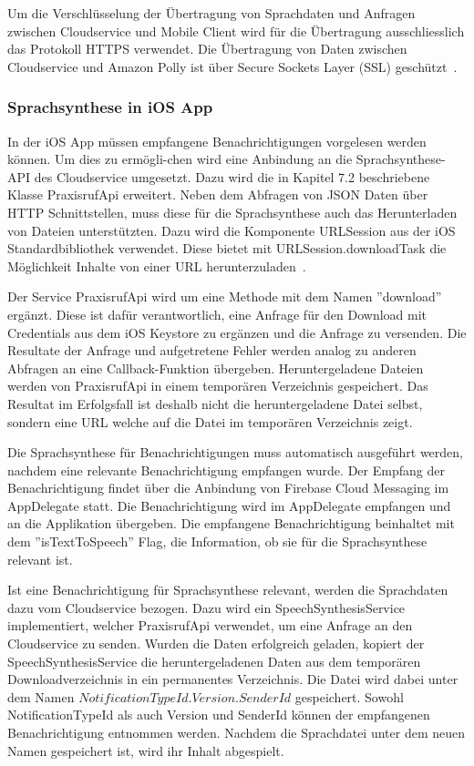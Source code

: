 Um die Verschlüsselung der Übertragung von Sprachdaten und Anfragen zwischen Cloudservice und Mobile Client wird für die Übertragung ausschliesslich das Protokoll HTTPS verwendet.
Die Übertragung von Daten zwischen Cloudservice und Amazon Polly ist über Secure Sockets Layer (SSL) geschützt~\cite{aws_polly_encryption_in_transit}.

\subsubsection{Sprachsynthese in iOS App}

In der iOS App müssen empfangene Benachrichtigungen vorgelesen werden können.
Um dies zu ermögli-chen wird eine Anbindung an die Sprachsynthese-API des Cloudservice umgesetzt.
Dazu wird die in Kapitel 7.2 beschriebene Klasse PraxisrufApi erweitert.
Neben dem Abfragen von JSON Daten über HTTP Schnittstellen, muss diese für die Sprachsynthese auch das Herunterladen von Dateien unterstützten.
Dazu wird die Komponente URLSession aus der iOS Standardbibliothek verwendet.
Diese bietet mit URLSession.downloadTask die Möglichkeit Inhalte von einer URL herunterzuladen~\cite{ios_downloadtask}.

Der Service PraxisrufApi wird um eine Methode mit dem Namen ''download'' ergänzt.
Diese ist dafür verantwortlich, eine Anfrage für den Download mit Credentials aus dem iOS Keystore zu ergänzen und die Anfrage zu versenden.
Die Resultate der Anfrage und aufgetretene Fehler werden analog zu anderen Abfragen an eine Callback-Funktion übergeben.
Heruntergeladene Dateien werden von PraxisrufApi in einem temporären Verzeichnis gespeichert.
Das Resultat im Erfolgsfall ist deshalb nicht die heruntergeladene Datei selbst, sondern eine URL welche auf die Datei im temporären Verzeichnis zeigt.

Die Sprachsynthese für Benachrichtigungen muss automatisch ausgeführt werden, nachdem eine relevante Benachrichtigung empfangen wurde.
Der Empfang der Benachrichtigung findet über die Anbindung von Firebase Cloud Messaging im AppDelegate statt.
Die Benachrichtigung wird im AppDelegate empfangen und an die Applikation übergeben.
Die empfangene Benachrichtigung beinhaltet mit dem ''isTextToSpeech'' Flag, die Information, ob sie für die Sprachsynthese relevant ist.

Ist eine Benachrichtigung für Sprachsynthese relevant, werden die Sprachdaten dazu vom Cloudservice bezogen.
Dazu wird ein SpeechSynthesisService implementiert, welcher PraxisrufApi verwendet, um eine Anfrage an den Cloudservice zu senden.
Wurden die Daten erfolgreich geladen, kopiert der SpeechSynthesisService die heruntergeladenen Daten aus dem temporären Downloadverzeichnis in ein permanentes Verzeichnis.
Die Datei wird dabei unter dem Namen $NotificationTypeId.Version.SenderId$ gespeichert.
Sowohl NotificationTypeId als auch Version und SenderId können der empfangenen Benachrichtigung entnommen werden.
Nachdem die Sprachdatei unter dem neuen Namen gespeichert ist, wird ihr Inhalt abgespielt.

